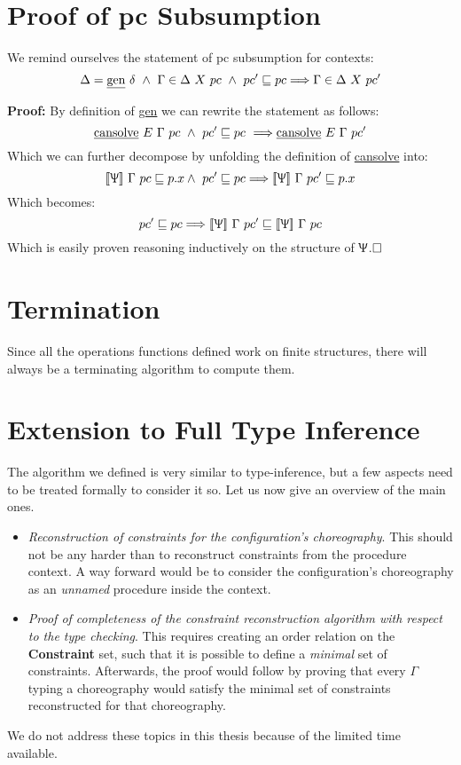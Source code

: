 \documentclass[12pt,a4paper,twoside]{book}
\newcommand{\llbracket}{[\![}
\newcommand{\rrbracket}{]\!]}
\newcommand{\qed}{\hfill\square}
\begin{document}
\section{Proof of pc Subsumption}
We remind ourselves the statement of pc subsumption for contexts:
$$
\Delta = \text{\underline{gen}}~\delta~\land~\Gamma\in\Delta ~X~pc~\land~pc' \sqsubseteq pc \Longrightarrow \Gamma \in \Delta~X~pc'
$$

\noindent\textbf{Proof:}
By definition of \underline{gen} we can rewrite the statement as follows:
$$
\text{\underline{cansolve}}~E~\Gamma~pc
~\land~pc'\sqsubseteq pc~\Longrightarrow
\text{\underline{cansolve}}~E~\Gamma~pc'
$$
Which we can further decompose by unfolding the definition of \underline{cansolve} into:
$$
\llbracket \Uppsi\rrbracket~\Gamma~pc\sqsubseteq p.x\land~pc'\sqsubseteq pc\Longrightarrow \llbracket \Uppsi\rrbracket~\Gamma~pc'\sqsubseteq p.x
$$
Which becomes:
$$
pc'\sqsubseteq pc\Longrightarrow \llbracket \Uppsi\rrbracket~\Gamma~pc'\sqsubseteq \llbracket\Uppsi\rrbracket~\Gamma~pc
$$
Which is easily proven reasoning inductively on the structure of $\Uppsi$.$\qed$

\section{Termination}
Since all the operations functions defined work on finite structures, there will always be a terminating algorithm to compute them.

\section{Extension to Full Type Inference}
The algorithm we defined is very similar to type-inference\cite{pierce2002types}, but a few aspects need to be treated formally to consider it so. Let us now give an overview of the main ones.
\begin{itemize}
\item \emph{Reconstruction of constraints for the configuration's choreography}. This should not be any harder than to reconstruct constraints from the procedure context. A way forward would be to consider the configuration's choreography as an \emph{unnamed} procedure inside the context.
\item \emph{Proof of completeness of the constraint reconstruction algorithm with respect to the type checking}. This requires creating an order relation on the \textbf{Constraint} set, such that it is possible to define a \emph{minimal} set of constraints. Afterwards, the proof would follow by proving that every $\Gamma$ typing a choreography would satisfy the minimal set of constraints reconstructed for that choreography.
\end{itemize}
We do not address these topics in this thesis because of the limited time available.
\end{document}
